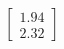 \documentclass[preview]{standalone}
\begin{document}
\begin{align*}
\begin{bmatrix} 1.94 \\ 2.32 \end{bmatrix}
\end{align*}
\end{document}
